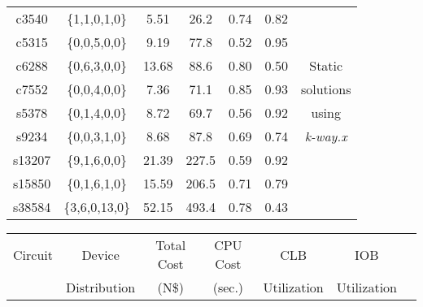 \begin{table}[hpbt]
\begin{center}
\begin{tabular}{|c|c|c|c|c|c|c|}
 c3540        &\{1,1,0,1,0\}  &5.51         & 26.2     &0.74          &0.82        & \hfill \\ \cline{1-6}
 c5315        &\{0,0,5,0,0\}  &9.19         & 77.8     &0.52          &0.95        & \hfill \\ \cline{1-6}
 c6288        &\{0,6,3,0,0\}  &13.68        & 88.6     &0.80          &0.50        & Static \\ \cline{1-6}
 c7552        &\{0,0,4,0,0\}  &7.36         & 71.1     &0.85          &0.93        & solutions \\ \cline{1-6}
 s5378        &\{0,1,4,0,0\}  &8.72         & 69.7     &0.56          &0.92        & using \\ \cline{1-6}
 s9234        &\{0,0,3,1,0\}  &8.68         & 87.8     &0.69          &0.74        & {\sl k-way.x} \\ \cline{1-6}
 s13207       &\{9,1,6,0,0\}  &21.39        & 227.5    &0.59          &0.92        & \hfill \\ \cline{1-6}
 s15850       &\{0,1,6,1,0\}  &15.59        & 206.5    &0.71          &0.79        & \hfill \\ \cline{1-6}
 s38584       &\{3,6,0,13,0\} &52.15        & 493.4    &0.78          &0.43        & \hfill \\ \hline
\end{tabular}
\end{center}
 
\vspace*{5mm}
\begin{center}
\begin{tabular}{|c|c|c|c|c|c|c|}\hline
 Circuit      &Device         &Total Cost   &CPU Cost  &CLB           &IOB         &\hfill \\
 \hfill       &Distribution   & (N\$)        &(sec.)    &Utilization   &Utilization &\hfill \\ \cline{1-6} \cline{1-6}
 

\end{tabular}
\end{center}
\end{table}
